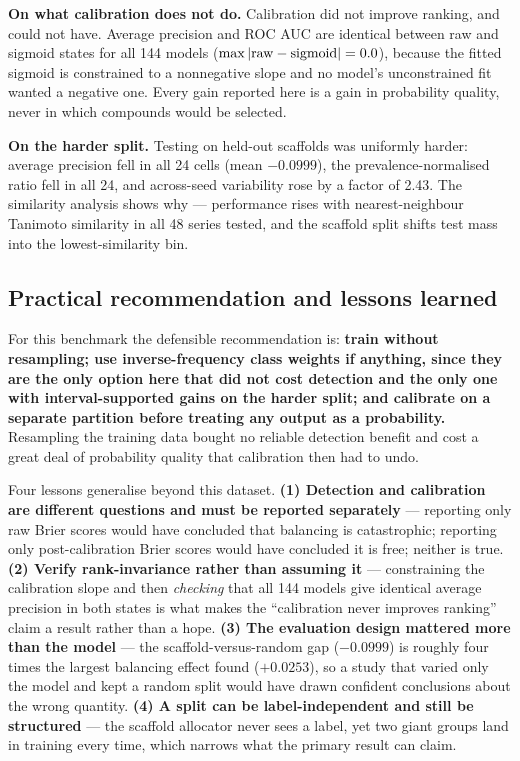 \documentclass[10pt,letterpaper]{article}
\begin{document}
\textbf{On what calibration does not do.} Calibration did not improve ranking, and could not have.
Average precision and ROC AUC are identical between raw and sigmoid states for all 144 models
($\max|{\rm raw}-{\rm sigmoid}| = 0.0$), because the fitted sigmoid is constrained to a nonnegative
slope and no model's unconstrained fit wanted a negative one. Every gain reported here is a gain in
probability quality, never in which compounds would be selected.

\textbf{On the harder split.} Testing on held-out scaffolds was uniformly harder: average precision
fell in all 24 cells (mean $-0.0999$), the prevalence-normalised ratio fell in all 24, and across-seed
variability rose by a factor of 2.43. The similarity analysis shows why --- performance rises with
nearest-neighbour Tanimoto similarity in all 48 series tested, and the scaffold split shifts test
mass into the lowest-similarity bin.

\subsection{Practical recommendation and lessons learned}

For this benchmark the defensible recommendation is: \textbf{train without resampling; use
inverse-frequency class weights if anything, since they are the only option here that did not cost
detection and the only one with interval-supported gains on the harder split; and calibrate on a
separate partition before treating any output as a probability.} Resampling the training data bought
no reliable detection benefit and cost a great deal of probability quality that calibration then had
to undo.

Four lessons generalise beyond this dataset. \textbf{(1) Detection and calibration are different
questions and must be reported separately} --- reporting only raw Brier scores would have concluded
that balancing is catastrophic; reporting only post-calibration Brier scores would have concluded it
is free; neither is true. \textbf{(2) Verify rank-invariance rather than assuming it} ---
constraining the calibration slope and then \emph{checking} that all 144 models give identical
average precision in both states is what makes the ``calibration never improves ranking'' claim a
result rather than a hope. \textbf{(3) The evaluation design mattered more than the model} --- the
scaffold-versus-random gap ($-0.0999$) is roughly four times the largest balancing effect found
($+0.0253$), so a study that varied only the model and kept a random split would have drawn
confident conclusions about the wrong quantity. \textbf{(4) A split can be label-independent and
still be structured} --- the scaffold allocator never sees a label, yet two giant groups land in
training every time, which narrows what the primary result can claim.
\end{document}
